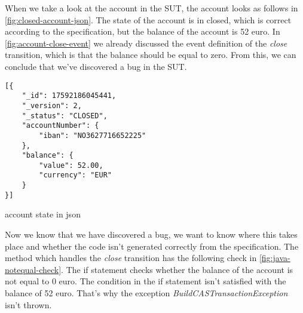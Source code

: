When we take a look at the account in the SUT, the account looks as
follows in \autoref{fig:closed-account-json}. The state of the account is in
closed, which is correct according to the specification, but the balance of the
account is 52 euro. In \autoref{fig:account-close-event} we already discussed
the event  definition of the \textit{close} transition, which is that the
balance should be equal to zero. From this, we can conclude that we've
discovered a bug in the SUT.

\begin{sourcecode}[h!]
\begin{lstlisting}[]
[{
	"_id": 17592186045441,
	"_version": 2,
	"_status": "CLOSED",
	"accountNumber": {
		"iban": "NO3627716652225"
	},
	"balance": {
		"value": 52.00,
		"currency": "EUR"
	}
}]
\end{lstlisting}
\caption{account state in json}\label{fig:closed-account-json}
\end{sourcecode}









Now we know that we have discovered a bug, we want to know where this takes
place and whether the code isn't generated correctly from the specification. The
method which handles the \textit{close} transition has the following check in
\autoref{fig:java-notequal-check}. The if statement checks whether the balance
of the account is not equal to 0 euro. The condition in the if statement isn't
satisfied with the balance of 52 euro. That's why the exception
\textit{BuildCASTransactionException} isn't thrown.

